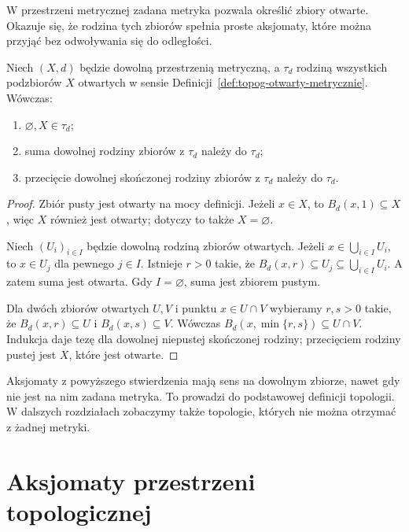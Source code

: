 W przestrzeni metrycznej zadana metryka pozwala określić
zbiory otwarte. Okazuje się, że rodzina tych zbiorów
spełnia proste aksjomaty, które można przyjąć bez
odwoływania się do odległości.

\begin{stwierdzenie}
\label{prop:topog-topologia-metryczna}
Niech $(X,d)$ będzie dowolną przestrzenią metryczną, a $\tau_d$
rodziną wszystkich podzbiorów $X$ otwartych w sensie
Definicji~\ref{def:topog-otwarty-metrycznie}.
Wówczas:
\begin{enumerate}[label=(\roman*)]
\item $\varnothing,X\in\tau_d$;
\item suma dowolnej rodziny zbiorów z $\tau_d$ należy do $\tau_d$;
\item przecięcie dowolnej skończonej rodziny zbiorów z $\tau_d$
      należy do $\tau_d$.
\end{enumerate}
\end{stwierdzenie}
\begin{proof}
Zbiór pusty jest otwarty na mocy definicji. Jeżeli $x\in X$,
to $B_d(x,1)\subseteq X$, więc $X$ również jest otwarty;
dotyczy to także $X=\varnothing$.

Niech $(U_i)_{i\in I}$ będzie dowolną rodziną zbiorów otwartych.
Jeżeli $x\in\bigcup_{i\in I}U_i$, to $x\in U_j$ dla pewnego $j\in I$.
Istnieje $r>0$ takie, że $B_d(x,r)\subseteq U_j\subseteq
\bigcup_{i\in I}U_i$. A zatem suma jest otwarta.
Gdy $I=\varnothing$, suma jest zbiorem pustym.

Dla dwóch zbiorów otwartych $U,V$ i punktu $x\in U\cap V$
wybieramy $r,s>0$ takie, że $B_d(x,r)\subseteq U$ i
$B_d(x,s)\subseteq V$. Wówczas
$B_d(x,\min\{r,s\})\subseteq U\cap V$.
Indukcja daje tezę dla dowolnej niepustej skończonej rodziny;
przecięciem rodziny pustej jest $X$, które jest otwarte.
\end{proof}

\begin{uwaga}
\label{rem:topog-nie-metryczna}
Aksjomaty z powyższego stwierdzenia mają sens na dowolnym zbiorze,
nawet gdy nie jest na nim zadana metryka. To prowadzi do podstawowej
definicji topologii. W dalszych rozdziałach zobaczymy także topologie,
których nie można otrzymać z żadnej metryki.
\end{uwaga}

\section{Aksjomaty przestrzeni topologicznej}
\label{sec:topog-aksjomaty}

